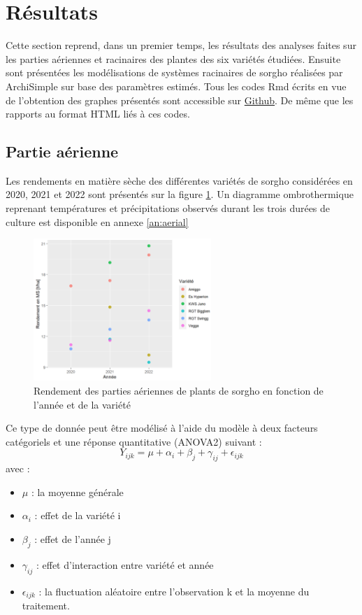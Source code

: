 \section{Résultats}

Cette section reprend, dans un premier temps, les résultats des analyses faites sur les parties aériennes et racinaires des plantes des six variétés étudiées.
Ensuite sont présentées les modélisations de systèmes racinaires de sorgho réalisées par ArchiSimple sur base des paramètres estimés.
Tous les codes Rmd écrits en vue de l'obtention des graphes présentés sont accessible sur \href{https://github.com/ndegives/Memoire}{Github}.
De même que les rapports au format HTML liés à ces codes.

\subsection{Partie aérienne}

Les rendements en matière sèche des différentes variétés de sorgho considérées en 2020, 2021 et 2022 sont présentés sur la figure \ref{fig:rendement}.
Un diagramme ombrothermique reprenant températures et précipitations observés durant les trois durées de culture est disponible en annexe \ref{an:aerial}

\begin{figure}[ht]
\centering
\includegraphics[width=0.6\textwidth]{Image/rendement.png}
\caption{Rendement des parties aériennes de plants de sorgho en fonction de l'année et de la variété}
\label{fig:rendement}
\end{figure}

Ce type de donnée peut être modélisé à l'aide du modèle à deux facteurs catégoriels et une réponse quantitative (ANOVA2) suivant :
\begin{equation}
    Y_{ijk} = \mu + \alpha_{i} + \beta_{j} + \gamma_{ij} + \epsilon_{ijk}
\end{equation}
avec :
\begin{itemize}
    \item $\mu$ : la moyenne générale
    \item $\alpha_i$ : effet de la variété i 
    \item $\beta_j$ : effet de l'année j
    \item $\gamma_{ij}$ : effet d'interaction entre variété et année
    \item $\epsilon_{ijk}$ : la fluctuation aléatoire entre l'observation k et la moyenne du traitement. 
\end{itemize}


